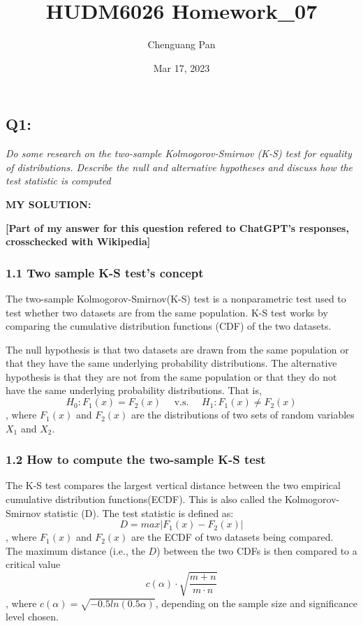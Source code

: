 \documentclass[
]{article}
\title{HUDM6026 Homework\_07}
\author{Chenguang Pan}
\date{Mar 17, 2023}
\begin{document}
\maketitle

\hypertarget{q1}{%
\subsection{Q1:}\label{q1}}

\emph{Do some research on the two-sample Kolmogorov-Smirnov (K-S) test
for equality of distributions. Describe the null and alternative
hypotheses and discuss how the test statistic is computed}

\textbf{MY SOLUTION:}

\textbf{{[}Part of my answer for this question refered to ChatGPT's
responses, crosschecked with Wikipedia{]}}

\hypertarget{two-sample-k-s-tests-concept}{%
\subsubsection{1.1 Two sample K-S test's
concept}\label{two-sample-k-s-tests-concept}}

The two-sample Kolmogorov-Smirnov(K-S) test is a nonparametric test used
to test whether two datasets are from the same population. K-S test
works by comparing the cumulative distribution functions (CDF) of the
two datasets.

The null hypothesis is that two datasets are drawn from the same
population or that they have the same underlying probability
distributions. The alternative hypothesis is that they are not from the
same population or that they do not have the same underlying probability
distributions. That is,
\[H_0: F_1(x)=F_2(x) \quad\text{ v.s. }\quad H_1: F_1(x)\neq F_2(x)\],
where \(F_1(x)\) and \(F_2(x)\) are the distributions of two sets of
random variables \(X_1\) and \(X_2\).

\hypertarget{how-to-compute-the-two-sample-k-s-test}{%
\subsubsection{1.2 How to compute the two-sample K-S
test}\label{how-to-compute-the-two-sample-k-s-test}}

The K-S test compares the largest vertical distance between the two
empirical cumulative distribution functions(ECDF). This is also called
the Kolmogorov-Smirnov statistic (D). The test statistic is defined as:
\[D=max|F_1(x)-F_2(x)|\], where \(F_1(x)\) and \(F_2(x)\) are the ECDF
of two datasets being compared.\\
The maximum distance (i.e., the \(D\)) between the two CDFs is then
compared to a critical value
\[c(\alpha)\cdot\sqrt{\frac{m+n}{m\cdot n}}\], where
\(c(\alpha)= \sqrt{-0.5ln(0.5\alpha)}\), depending on the sample size
and significance level chosen.
\end{document}
